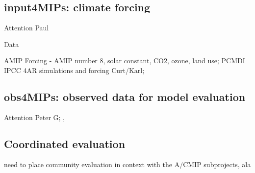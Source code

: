 \documentclass[gmd, preprint]{copernicus}
\newcommand{\mycomment}[1]{}
\def\cred#1{{\color{red}#1}}
\begin{document}
\subsection{input4MIPs: climate forcing}
\label{sec:input4MIPs}
\cred{Attention Paul}

Data

\cred{AMIP Forcing \citet{gleckler_amip_1996-1} - AMIP number 8, solar constant, CO2, ozone, land use; PCMDI IPCC 4AR simulations and forcing Curt/Karl;  \citet{durack_toward_2018}}
\mycomment{
CMIP3
https://pcmdi.llnl.gov/mips/cmip/ann_20c3m.html
https://web.archive.org/web/20040706074446/http://www-pcmdi.llnl.gov/cmip/
https://web.archive.org/web/20040827091054/http://www-pcmdi.llnl.gov/cmip/
CMIP5
https://pcmdi.llnl.gov/mips/cmip5/forcing.html
Old information CMIP paths
/Users/durack1/sync/Docs/admin/LLNL/12/120607_PaulDurack_PCMDI-CMIP5DataMeeting_LLNL.pdf
/Users/durack1/sync/Docs/admin/LLNL/17/151202_covey1_CMIP1And2/151202_covey1-CMIP1Documentation.pdf
/Users/durack1/sync/Docs/admin/LLNL/17/151202_covey1_CMIP1And2/170530_gleckler1_CMIPPaths.pdf
}


\subsection{obs4MIPs: observed data for model evaluation}
\cred{Attention Peter G; \citet{teixeira_satellite_2011}, \citet{waliser_observations_2020}}



\subsection{Coordinated evaluation}
\cred{need to place community evaluation in context with the A/CMIP subprojects, ala \citet{gates_amip_1992}}
\end{document}
